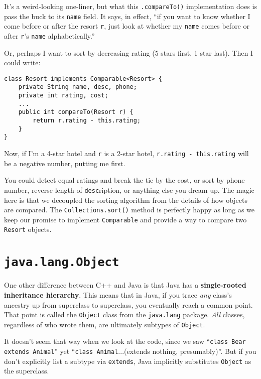 It's a weird-looking one-liner, but what this \texttt{.compareTo()}
implementation does is pass the buck to its \texttt{name} field. It says, in
effect, ``if you want to know whether I come before or after the resort
\texttt{r}, just look at whether my \texttt{name} comes before or after
\texttt{r}'s \texttt{name} alphabetically.''

Or, perhaps I want to sort by decreasing rating (5 stars first, 1 star last).
Then I could write:

\begin{Verbatim}[fontsize=\footnotesize,samepage=true,frame=single]
class Resort implements Comparable<Resort> {
    private String name, desc, phone;
    private int rating, cost;
    ...
    public int compareTo(Resort r) {
        return r.rating - this.rating;
    }
}
\end{Verbatim}

Now, if I'm a 4-star hotel and \texttt{r} is a 2-star hotel, \texttt{r.rating
- this.rating} will be a negative number, putting me first.

You could detect equal ratings and break the tie by the cost, or sort by phone
number, reverse length of \texttt{desc}ription, or anything else you dream up.
The magic here is that we decoupled the sorting algorithm from the details of
how objects are compared. The \texttt{Collections.sort()} method is perfectly
happy as long as we keep our promise to implement \texttt{Comparable} and
provide a way to compare two \texttt{Resort} objects.


\section{\texttt{java.lang.Object}}

One other difference between C++ and Java is that Java has a
\textbf{single-rooted inheritance hierarchy}. This means that in Java, if you
trace \textit{any} class's ancestry up from superclass to superclass, you
eventually reach a common point. That point is called the \texttt{Object}
class from the \texttt{java.lang} package. \textit{All} classes, regardless of
who wrote them, are ultimately subtypes of \texttt{Object}.

It doesn't seem that way when we look at the code, since we saw
``\texttt{class Bear extends Animal}'' yet ``\texttt{class Animal}...(extends
nothing, presumably)''. But if you don't explicitly list a subtype via
\texttt{extends}, Java implicitly substitutes \texttt{Object} as the
superclass.

